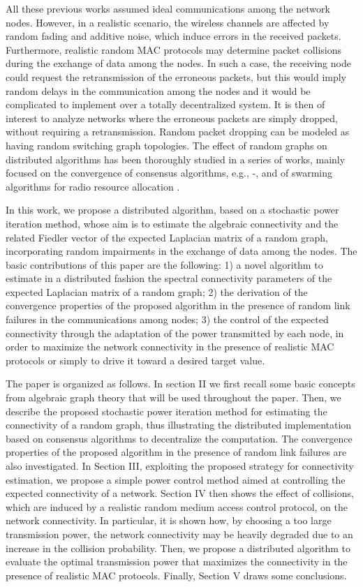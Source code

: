 \documentclass[10pt,twocolumn]{IEEEtran}
\begin{document}
All these previous works assumed ideal communications among the network nodes. However, in a realistic scenario, the wireless channels are affected by random fading and additive noise, which induce errors in the received packets. Furthermore, realistic random MAC protocols may determine packet collisions during the exchange of data among the nodes. In such a case, the receiving node could request the retransmission of the erroneous packets, but this would imply random delays in the communication among the nodes and it would be complicated to implement over a totally decentralized system. It is then of interest to analyze networks where the erroneous packets are simply dropped, without requiring a retransmission. Random packet dropping can be modeled as having random switching graph topologies. The effect of random graphs on distributed algorithms has been thoroughly studied in a series of works, mainly focused on the convergence of consensus algorithms, e.g., \cite{Hatano}-\cite{Kar-Moura2}, and of swarming algorithms for radio resource allocation \cite{DiLo_Barb2}.



In this work, we propose a distributed algorithm, based on a stochastic power iteration method, whose aim is to estimate the algebraic connectivity and the related Fiedler vector of the expected Laplacian matrix of a random graph, incorporating random impairments in the exchange of data among the nodes. The basic contributions of this paper are the following: 1) a novel algorithm to estimate in a distributed fashion the spectral connectivity parameters of the expected Laplacian matrix of a random graph; 2) the derivation of the convergence properties of the proposed algorithm in the presence of random link failures in the communications among nodes; 3) the control of the expected connectivity through the adaptation of the power transmitted by each node, in order to maximize the network connectivity in the presence of realistic MAC protocols or simply to drive it toward a desired target value.

The paper is organized as follows. In section II we first recall some basic concepts from algebraic graph theory that will be used throughout the paper. Then, we describe the proposed stochastic power iteration method for estimating the connectivity of a random graph, thus illustrating the distributed implementation based on consensus algorithms to decentralize the computation. The convergence properties of the proposed algorithm in the presence of random link failures are also investigated. In Section III, exploiting the proposed strategy for connectivity estimation, we propose a simple power control method aimed at controlling the expected connectivity of a network. Section IV then shows the effect of collisions, which are induced by a realistic random medium access control protocol, on the network connectivity. In particular, it is shown how, by choosing a too large transmission power, the network connectivity may be heavily degraded due to an increase in the collision probability. Then, we propose a distributed algorithm to evaluate the optimal transmission power that maximizes the connectivity in the presence of realistic MAC protocols. Finally, Section V draws some conclusions.
\end{document}
